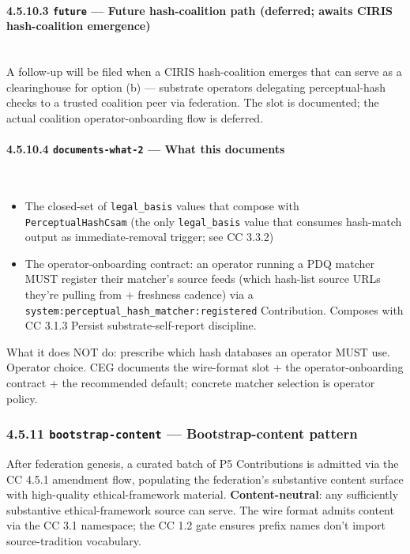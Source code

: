 \documentclass[11pt]{article}
\begin{document}
\paragraph{4.5.10.3 \texttt{future} — Future hash-coalition path (deferred; awaits CIRIS hash-coalition emergence)}\mbox{}\\


A follow-up will be filed when a CIRIS hash-coalition emerges that can serve as a clearinghouse for option (b) — substrate operators delegating perceptual-hash checks to a trusted coalition peer via federation. The slot is documented; the actual coalition operator-onboarding flow is deferred.


\paragraph{4.5.10.4 \texttt{documents-what-2} — What this documents}\mbox{}\\


\begin{itemize}\setlength\itemsep{0pt}
\item The closed-set of \texttt{legal\_basis} values that compose with \texttt{PerceptualHashCsam} (the only \texttt{legal\_basis} value that consumes hash-match output as immediate-removal trigger; see CC 3.3.2)
\item The operator-onboarding contract: an operator running a PDQ matcher MUST register their matcher's source feeds (which hash-list source URLs they're pulling from + freshness cadence) via a \texttt{system:perceptual\_hash\_matcher:registered} Contribution. Composes with CC 3.1.3 Persist substrate-self-report discipline.
\end{itemize}


What it does NOT do: prescribe which hash databases an operator MUST use. Operator choice. CEG documents the wire-format slot + the operator-onboarding contract + the recommended default; concrete matcher selection is operator policy.


\subsubsection*{4.5.11 \texttt{bootstrap-content} — Bootstrap-content pattern}


After federation genesis, a curated batch of P5 Contributions is admitted via the CC 4.5.1 amendment flow, populating the federation's substantive content surface with high-quality ethical-framework material. \textbf{Content-neutral}: any sufficiently substantive ethical-framework source can serve. The wire format admits content via the CC 3.1 namespace; the CC 1.2 gate ensures prefix names don't import source-tradition vocabulary.
\end{document}
